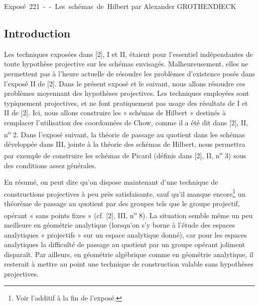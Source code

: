 \unit{Exposé 221 -- Les schémas de Hilbert}
%
  {par Alexander GROTHENDIECK}

\subsection*{Introduction}

Les techniques exposées dans [2], I et II, étaient pour l'essentiel
indépendantes de toute hypothèse projective sur les schémas envisagés.
Malheureusement, elles ne permettent pas à l'heure actuelle de résoudre les
problèmes d'existence posés dans l'exposé II de [2]. Dans le présent exposé et
le suivant, nous allons résoudre ces problèmes moyennant des hypothèses
projectives. Les techniques employées sont typiquement projectives, et ne font
pratiquement pas usage des résultats de I et II de [2]. Ici, nous allons
construire les « schémas de Hilbert » destinés à remplacer l'utilisation des
coordonnées de Chow, comme il a été dit dans [2], II, n\textsuperscript{o} 2.
Dans l'exposé suivant, la théorie de passage au quotient dans les schémas
développée dans III, jointe à la théorie des schémas de Hilbert, nous permettra
par exemple de construire les schémas de Picard (définis dans [2], II,
n\textsuperscript{o} 3) sous des conditions assez générales.

En résumé, on peut dire qu'on dispose maintenant d'une technique de
constructions projectives à peu près satisfaisante, sauf qu'il manque
encore\footnote{Voir l'additif à la fin de l'exposé.} un théorème de passage au
quotient par des groupes tels que le groupe projectif, opérant « sans points
fixes » (cf. [2], III, n\textsuperscript{o} 8). La situation semble même un peu
meilleure en géométrie analytique (lorsqu'on s'y borne à l'étude des espaces
analytiques « projectifs » sur un espace analytique donné), car pour les
espaces analytiques la difficulté de passage au quotient par un groupe opérant
joliment disparaît. Par ailleurs, en géométrie algébrique comme en géométrie
analytique, il resterait à mettre au point une technique de construction
valable sans hypothèses projectives.


